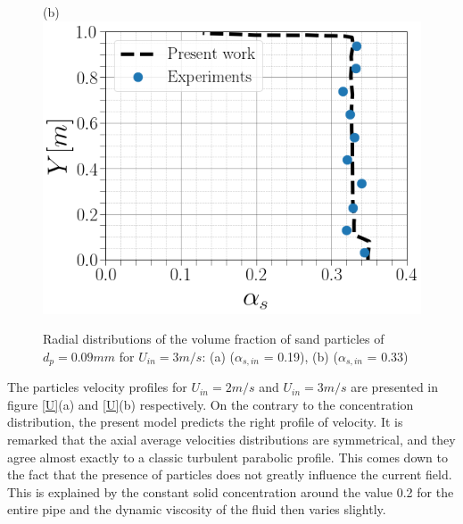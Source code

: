 \documentclass[11pt]{report}
\begin{document}
%
 \begin{figure}[ht!]
 \begin{center}
 (b)\includegraphics[scale = 0.3]{figs/C33}
 \end{center}
 \end{figure}
%
 \begin{figure}[ht!]
 \centering
 \caption{Radial distributions of the volume fraction of sand particles of $d_p= 0.09 mm$ for $U_{in} = 3 m/s$: (a) ($\alpha_{s,in}$ = 0.19), (b) ($\alpha_{s,in}$ = 0.33) }
 \label{solid}
 \end{figure}
 The particles velocity  profiles for $U_{in} = 2 m/s$ and $U_{in} = 3 m/s$ are presented in figure \ref{U}(a) and \ref{U}(b) respectively. 
 On the contrary to the concentration distribution, the present model predicts the right profile of velocity. 
 It is remarked that the axial average velocities  distributions are symmetrical, and they agree almost exactly to a classic turbulent parabolic profile. 
 This comes down to the fact that the presence of particles does not greatly influence the current field. 
 This is explained by the constant solid concentration around the value 0.2 for the entire pipe and the dynamic viscosity of the fluid then varies slightly.\\
%
\end{document}
